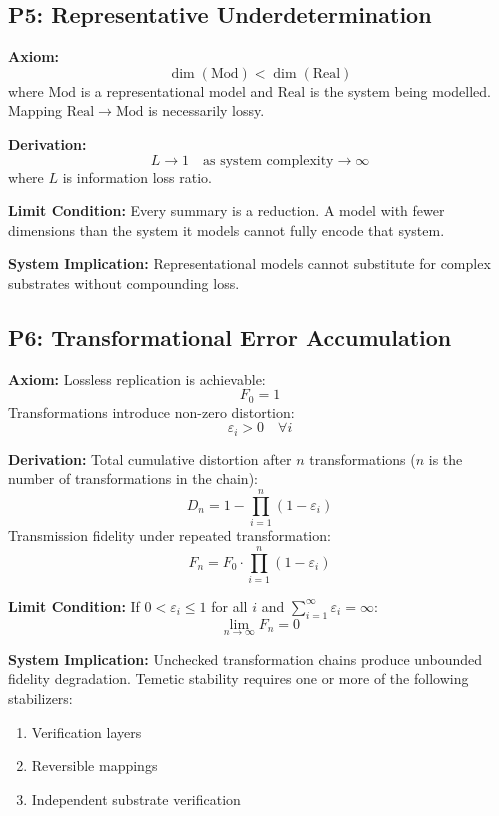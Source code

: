 \documentclass{article}
\newcommand{\Real}{\mathrm{Real}}
\newcommand{\Mod}{\mathrm{Mod}}
\begin{document}
\bigskip

\subsection*{P5: Representative Underdetermination}

\textbf{Axiom:}
\[ \dim(\Mod) < \dim(\Real) \]
where $\Mod$ is a representational model and $\Real$ is the system being modelled.
Mapping $\Real \to \Mod$ is necessarily lossy.

\textbf{Derivation:}
\[ L \rightarrow 1 \quad \text{as system complexity} \rightarrow \infty \]
where $L$ is information loss ratio.

\textbf{Limit Condition:} Every summary is a reduction. A model with fewer dimensions than the system it models
cannot fully encode that system.

\textbf{System Implication:} Representational models cannot substitute for complex
substrates without compounding loss.

\bigskip

\subsection*{P6: Transformational Error Accumulation}

\textbf{Axiom:} Lossless replication is achievable:
\[ F_0 = 1 \]
Transformations introduce non-zero distortion:
\[ \varepsilon_i > 0 \quad \forall i \]

\textbf{Derivation:} Total cumulative distortion after $n$ transformations ($n$ is the number of transformations in the chain):
\[ D_n = 1 - \prod_{i=1}^{n}(1 - \varepsilon_i) \]
Transmission fidelity under repeated transformation:
\[ F_n = F_0 \cdot \prod_{i=1}^{n}(1 - \varepsilon_i) \]

\textbf{Limit Condition:} If \(0 < \varepsilon_i \le 1\) for all \(i\) and \(\sum_{i=1}^{\infty}\varepsilon_i = \infty\):
\[ \lim_{n \to \infty} F_n = 0 \]

\textbf{System Implication:} Unchecked transformation chains produce unbounded
fidelity degradation. Temetic stability requires one or more of the following
stabilizers:
\begin{enumerate}
    \item Verification layers
    \item Reversible mappings
    \item Independent substrate verification
\end{enumerate}
\end{document}
